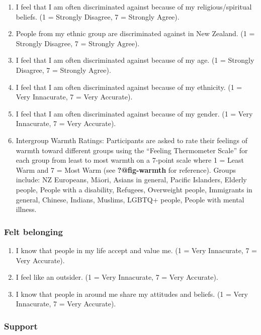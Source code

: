 \documentclass[
]{interact}
\providecommand{\tightlist}{%
  \setlength{\itemsep}{0pt}\setlength{\parskip}{0pt}}\usepackage{longtable,booktabs,array}
\begin{document}
\begin{enumerate}
\def\labelenumi{\arabic{enumi}.}
\tightlist
\item
  I feel that I am often discriminated against because of my
  religious/spiritual beliefs. (1 = Strongly Disagree, 7 = Strongly
  Agree).
\item
  People from my ethnic group are discriminated against in New Zealand.
  (1 = Strongly Disagree, 7 = Strongly Agree).
\item
  I feel that I am often discriminated against because of my age. (1 =
  Strongly Disagree, 7 = Strongly Agree).
\item
  I feel that I am often discriminated against because of my ethnicity.
  (1 = Very Innacurate, 7 = Very Accurate).
\item
  I feel that I am often discriminated against because of my gender. (1
  = Very Innacurate, 7 = Very Accurate).
\item
  Intergroup Warmth Ratings: Participants are asked to rate their
  feelings of warmth toward different groups using the ``Feeling
  Thermometer Scale'' for each group from least to most warmth on a
  7-point scale where 1 = Least Warm and 7 = Most Warm (see
  \textbf{?@fig-warmth} for reference). Groups include: NZ Europeans,
  Māori, Asians in general, Pacific Islanders, Elderly people, People
  with a disability, Refugees, Overweight people, Immigrants in general,
  Chinese, Indians, Muslims, LGBTQ+ people, People with mental illness.
\end{enumerate}

\subsubsection{Felt belonging}\label{felt-belonging}

\begin{enumerate}
\def\labelenumi{\arabic{enumi}.}
\tightlist
\item
  I know that people in my life accept and value me. (1 = Very
  Innacurate, 7 = Very Accurate).
\item
  I feel like an outsider. (1 = Very Innacurate, 7 = Very Accurate).
\item
  I know that people in around me share my attitudes and beliefs. (1 =
  Very Innacurate, 7 = Very Accurate).
\end{enumerate}

\subsubsection{Support}\label{support}
\end{document}
